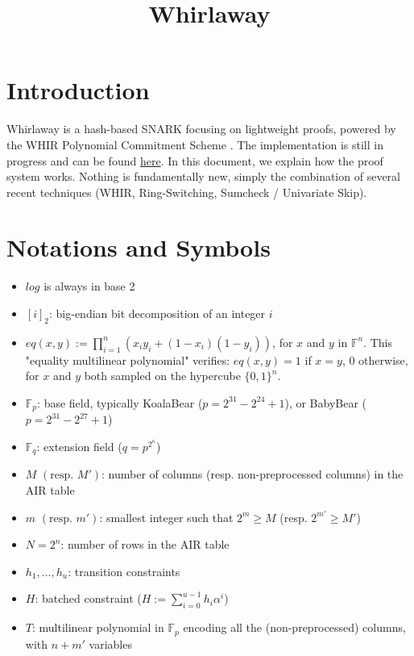 \documentclass{article}
\title{Whirlaway}
\author{}
\date{}
\newcommand{\Fp}{\mathbb F_p}
\newcommand{\Fq}{\mathbb F_q}
\newcommand{\Pol}{T}
\begin{document}
\maketitle

\section{Introduction}

Whirlaway is a hash-based SNARK focusing on lightweight proofs, powered by the WHIR Polynomial Commitment Scheme \cite{whir}. The implementation is still in progress and can be found \href{https://github.com/TomWambsgans/Whirlaway}{here}. In this document, we explain how the proof system works. Nothing is fundamentally new, simply the combination of several recent techniques (WHIR, Ring-Switching, Sumcheck /  Univariate Skip).

\section{Notations and Symbols}

\begin{itemize}
    \item $log$ is always in base 2
    \item $[i]_2$: big-endian bit decomposition of an integer $i$
    \item $eq(x, y) := \prod_{i = 1}^{n} (x_i y_i + (1 - x_i) (1 - y_i))$, for $x$ and $y$ in $\mathbb F^n$. This "equality multilinear polynomial" verifies: $eq(x, y) = 1$ if $x = y$, $0$ otherwise, for $x$ and $y$ both sampled on the hypercube $\{0, 1\}^n$.
    \item $\Fp$: base field, typically KoalaBear ($p = 2^{31} - 2^{24} + 1$), or BabyBear ($p = 2^{31} - 2^{27} + 1$)
    \item $\Fq$: extension field ($q = p^{2^\kappa}$)
    \item $M$ $(\text{resp. } M')$: number of columns (resp. non-preprocessed columns) in the AIR table
    \item $m$ $(\text{resp. } m')$: smallest integer such that $2^m \geq M$ (resp. $2^{m'} \geq M'$)
    \item $N = 2^n$: number of rows in the AIR table
    \item $h_1, \dots, h_u$: transition constraints
    \item $H$: batched constraint ($H := \sum_{i=0}^{u-1} h_i \alpha^i $)
    \item $\Pol$: multilinear polynomial in $\Fp$ encoding all the (non-preprocessed) columns, with $n + m'$ variables
\end{itemize}
\end{document}
